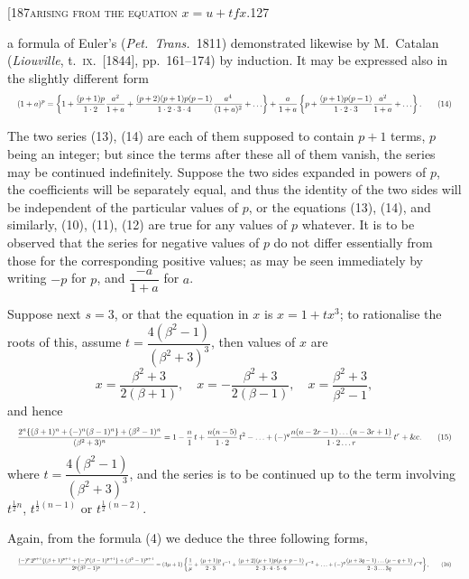 \documentclass[11pt]{article}
\begin{document}
\begin{center}\small[187\hfill\textsc{arising from the equation $x = u + tf x$.}\hfill\textsc{127}\end{center}

\noindent a formula of Euler's (\textit{Pet.\ Trans.}\ 1811) demonstrated likewise by M.\ Catalan (\textit{Liouville},
t.\ \textsc{ix}.\ [1844], pp.\ 161--174) by induction. It may be expressed also in the slightly
different form
\[ \resizebox{\textwidth}{!}{$\displaystyle
(1+a)^{p} = \left\{1 + \frac{(p+1)p}{1\cdot 2}\frac{a^{2}}{1+a} + \frac{(p+2)(p+1)p(p-1)}{1\cdot 2\cdot 3\cdot 4}\frac{a^{4}}{(1+a)^{2}} + \ldots\right\} + \frac{a}{1+a}\left\{p + \frac{(p+1)p(p-1)}{1\cdot 2\cdot 3}\frac{a^{2}}{1+a} + \ldots\right\}. \qquad (14)
$} \]

The two series (13), (14) are each of them supposed to contain $p+1$ terms, $p$ being
an integer; but since the terms after these all of them vanish, the series may be
continued indefinitely. Suppose the two sides expanded in powers of $p$, the coefficients
will be separately equal, and thus the identity of the two sides will be independent
of the particular values of $p$, or the equations (13), (14), and similarly, (10), (11), (12)
are true for any values of $p$ whatever. It is to be observed that the series for
negative values of $p$ do not differ essentially from those for the corresponding positive
values; as may be seen immediately by writing $-p$ for $p$, and $\dfrac{-a}{1+a}$ for $a$.

\medskip
Suppose next $s = 3$, or that the equation in $x$ is $x = 1 + tx^{3}$; to rationalise the
roots of this, assume $t = \dfrac{4(\beta^{2}-1)}{(\beta^{2}+3)^{3}}$, then values of $x$ are
\[
x = \frac{\beta^{2}+3}{2(\beta+1)},\quad x = -\frac{\beta^{2}+3}{2(\beta-1)},\quad x = \frac{\beta^{2}+3}{\beta^{2}-1},
\]
and hence
\[ \resizebox{\textwidth}{!}{$\displaystyle
\frac{2^{n}\{(\beta+1)^{n} + (-)^{n}(\beta-1)^{n}\} + (\beta^{2}-1)^{n}}{(\beta^{2}+3)^{n}} = 1 - \frac{n}{1}\,t + \frac{n(n-5)}{1\cdot 2}\,t^{2} - \ldots + (-)^{q}\frac{n(n-2r-1)\ldots(n-3r+1)}{1\cdot 2\ldots r}\,t^{r} + \&\text{c.} \qquad (15)
$} \]
where $t = \dfrac{4(\beta^{2}-1)}{(\beta^{2}+3)^{3}}$, and the series is to be continued up to the term involving
$t^{\frac{1}{2}n}$, $t^{\frac{1}{2}(n-1)}$ or $t^{\frac{1}{2}(n-2)}$.

Again, from the formula (4) we deduce the three following forms,
\[ \resizebox{\textwidth}{!}{$\displaystyle
\frac{(-)^{p}\, 2^{p+1}\{(\beta+1)^{p+1} + (-)^{p}(\beta-1)^{p+1}\} + (\beta^{2}-1)^{p+1}}{2^{p}(\beta^{2}-1)^{p}} = (3\mu+1)\left\{\frac{1}{\mu} + \frac{(\mu+1)p}{2\cdot 3}\,t^{-1} + \frac{(\mu+2)(\mu+1)p(\mu+p-1)}{2\cdot 3\cdot 4\cdot 5\cdot 6}\,t^{-2} + \ldots + (-)^{q}\frac{(\mu+3q-1)\ldots(\mu-q+1)}{2\cdot 3\ldots 3q}\,t^{-q}\right\}, \qquad (16)
$} \]
\end{document}
